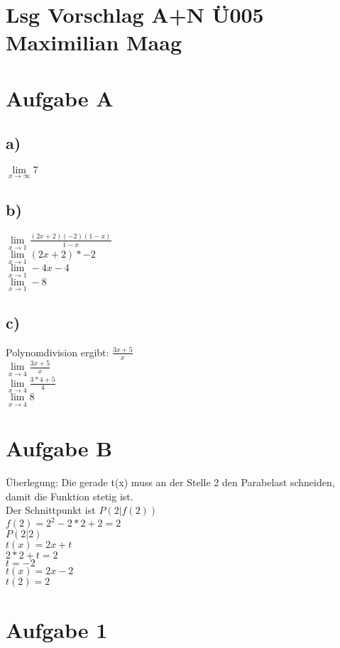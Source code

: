 \documentclass{article}
\begin{document}
	\section*{Lsg Vorschlag A+N Ü005 Maximilian Maag}
	\section*{Aufgabe A}
	\subsection*{a)}
	$\lim\limits_{x\to\infty} 7$
	\subsection*{b)}
	$\lim\limits_{x\to 1} \frac{(2x+2)(-2)(1-x)}{1-x}$ \\
	$\lim\limits_{x\to 1} (2x+2)*-2$ \\
	$\lim\limits_{x\to 1} -4x - 4$ \\
	$\lim\limits_{x\to 1} -8$ \\
	\subsection*{c)}
	Polynomdivision ergibt: $\frac{3x + 5}{x}$ \\
	$\lim\limits_{x\to 4} \frac{3x + 5}{x}$ \\
	$\lim\limits_{x\to 4} \frac{3*4 + 5}{4}$ \\
	$\lim\limits_{x\to 4} 8$
	\section*{Aufgabe B}
	Überlegung: Die gerade t(x) muss an der Stelle 2 den Parabelast schneiden, damit die Funktion stetig ist. \\
	Der Schnittpunkt ist $P(2|f(2))$ \\
	$f(2) = 2^2 - 2 * 2 + 2 = 2$ \\
	$P(2|2)$ \\
	$t(x) = 2x + t$ \\
	$ 2 * 2 + t = 2$ \\
	$t = -2$ \\
	$t(x) = 2x -2$ \\
	$t(2) = 2$ \\
	
	\section*{Aufgabe 1}
\end{document}
